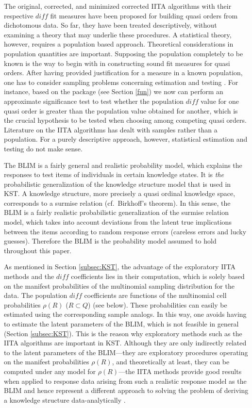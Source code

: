 \documentclass[nojss]{jss}
\begin{document}
The original, corrected, and minimized corrected IITA algorithms with their 
respective $\mathit{diff}$ fit measures have been proposed for building quasi orders 
from dichotomous data. So far, they have been treated descriptively, without 
examining a theory that may underlie these procedures. A statistical theory, however, 
requires a population based approach. Theoretical considerations in population quantities
are important. Supposing the population completely to be known is the way to begin 
with in constructing sound fit measures for quasi orders. After having provided justification 
for a measure in a known population, one has to consider sampling problems 
concerning estimation and testing \citep{GK:79}. For instance, based on the package 
 (see Section \ref{fun}) we now can perform an approximate significance test 
to test whether the population $\mathit{diff}$ value for one quasi order 
is greater than the population value obtained for another, which is the crucial hypothesis 
to be tested when choosing among competing quasi orders. 
Literature on the IITA algorithms has dealt with samples rather than a  
population. For a purely descriptive approach, however, statistical 
estimation and testing do not make sense.

The BLIM is a fairly general and realistic probability model, which explains the responses 
to test items of individuals in certain knowledge states. It is \textit{the} probabilistic generalization 
of the knowledge structure model that is used in KST. A knowledge structure, more precisely 
a quasi ordinal knowledge space, corresponds to a surmise relation (cf.\ Birkhoff's theorem). 
In this sense, the BLIM is a fairly realistic probabilistic generalization of the surmise relation model,
which takes into account deviations from the latent true implications between the items 
according to random response errors (careless errors and lucky guesses). 
Therefore the BLIM is the probability model assumed to hold throughout this paper.

As mentioned in Section \ref{subsec:KST}, the advantage of the exploratory IITA methods 
and the $\mathit{diff}$ coefficients lies in their computation, which is solely based on the manifest
probabilities of the multinomial sampling distribution for the data. The population $\mathit{diff}$ coefficients are functions of the multinomial cell probabilities $\rho(R)$ ($R\subset Q$)
(see below). These probabilities can easily be estimated using the corresponding 
sample analogs. In this way, one avoids having to estimate the latent parameters of the BLIM, 
which is not feasible in general (Section \ref{subsec:KST}).
This is the reason why exploratory methods such as the IITA algorithms are important in KST.
Although they are only indirectly related to the latent parameters of the BLIM---they are 
exploratory procedures operating on the manifest probabilities $\rho(R)$, and theoretically at least,
they can be computed under any model for $\rho(R)$---the IITA methods provide good results 
when applied to response data arising from such a realistic response model as the BLIM 
and hence represent a different approach to solving the problem of deriving a knowledge 
structure data-analytically \citep[for details, see][]{SU:09,US:10}.
\end{document}
